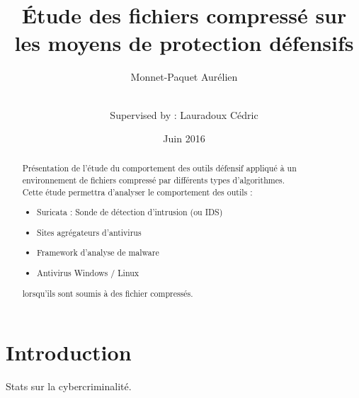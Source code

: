\documentclass[smallextended]{svjour3}       %
\begin{document}
\title{Étude des fichiers compressé sur les moyens de protection défensifs}


\author{Monnet-Paquet Aurélien  \\ \and \\
        Supervised by : Lauradoux Cédric
}



\date{Juin 2016}


\maketitle

\begin{abstract}
$ $\\Présentation de l'étude du comportement des outils défensif appliqué à un environnement de fichiers compressé par différents types d'algorithmes.\\
Cette étude permettra d'analyser le comportement des outils :
\begin{itemize}
\item Suricata : Sonde de détection d'intrusion (ou IDS)
\item Sites agrégateurs d'antivirus
\item Framework d'analyse de malware
\item Antivirus Windows / Linux
\end{itemize}
lorsqu'ils sont soumis à des fichier compressés.

\end{abstract}

\section{Introduction}
\label{intro}
Stats sur la cybercriminalité.
\end{document}
